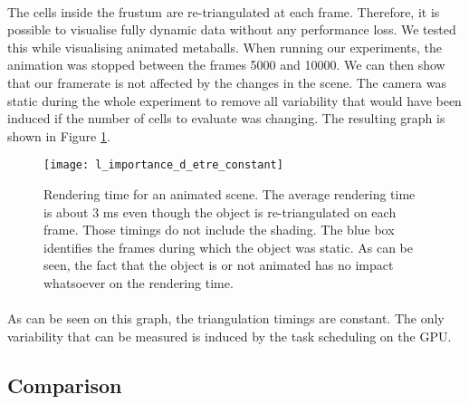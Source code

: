 \paragraph{}
The cells inside the frustum are re-triangulated at each frame.
Therefore, it is possible to visualise fully dynamic data without any performance loss.
We tested this while visualising animated metaballs.
When running our experiments, the animation was stopped between the frames 5000 and 10000.
We can then show that our framerate is not affected by the changes in the scene.
The camera was static during the whole experiment to remove all variability that would have been induced if the number of cells to evaluate was changing.
The resulting graph is shown in Figure \ref{metaballs_graph}.

\begin{figure}
\centering
\texttt{[image: l\_importance\_d\_etre\_constant]}
\caption{Rendering time for an animated scene. 
The average rendering time is about 3 ms even though the object is re-triangulated on each frame.
Those timings do not include the shading.
The blue box identifies the frames during which the object was static.
As can be seen, the fact that the object is or not animated has no impact whatsoever on the rendering time.}
\label{metaballs_graph}
\end{figure}

\paragraph{}
As can be seen on this graph, the triangulation timings are constant.
The only variability that can be measured is induced by the task scheduling on the GPU.


\subsection{Comparison}



